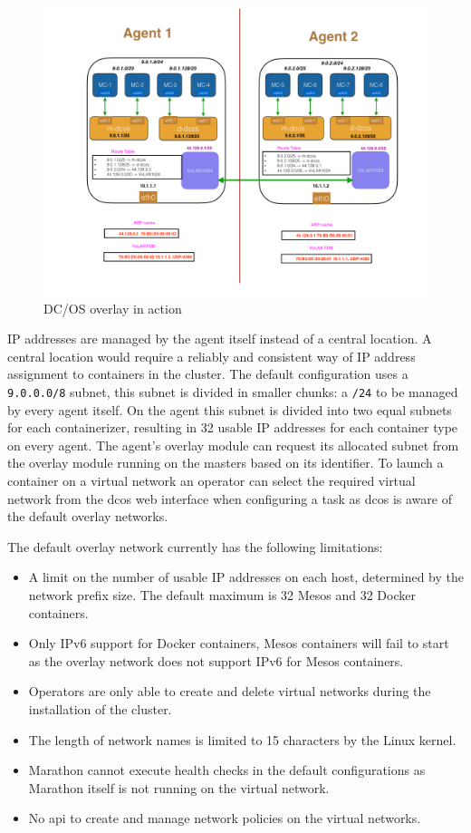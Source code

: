 \begin{figure}
    \centering
    \includegraphics[width=1\columnwidth]{images/dcos-overlay-arch}
    \caption{DC/OS overlay in action\cite{dcos_overlay_arch}}
    \label{fig:dcos-overlay-arch}
\end{figure}

IP addresses are managed by the agent itself instead of a central location. A central location would require a reliably and consistent way of IP address assignment to containers in the cluster. The default configuration uses a \texttt{9.0.0.0/8} subnet, this subnet is divided in smaller chunks: a \texttt{/24} to be managed by every agent itself. On the agent this subnet is divided into two equal subnets for each containerizer, resulting in 32 usable IP addresses for each container type on every agent. The agent's overlay module can request its allocated subnet from the overlay module running on the masters based on its identifier. To launch a container on a virtual network an operator can select the required virtual network from the \gls{dcos} web interface when configuring a task as \gls{dcos} is aware of the default overlay networks.

The default overlay network currently has the following limitations:
\begin{itemize}
    \item A limit on the number of usable IP addresses on each host, determined by the network prefix size. The default maximum is 32 Mesos and 32 Docker containers.
    \item Only IPv6 support for Docker containers, Mesos containers will fail to start as the overlay network does not support IPv6 for Mesos containers.
    \item Operators are only able to create and delete virtual networks during the installation of the cluster.
    \item The length of network names is limited to 15 characters by the Linux kernel.
    \item Marathon cannot execute health checks in the default configurations as Marathon itself is not running on the virtual network.
    \item No \gls{api} to create and manage network policies on the virtual networks.
\end{itemize}

